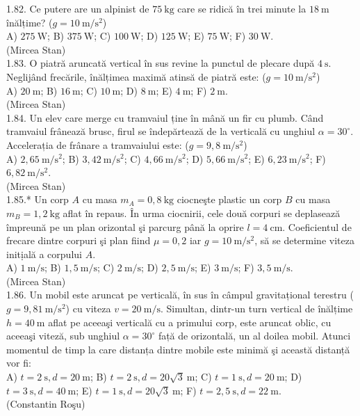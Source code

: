 \documentclass[10pt]{article}
\begin{document}
1.82. Ce putere are un alpinist de $75 \mathrm{~kg}$ care se ridică în trei minute la $18 \mathrm{~m}$ înălțime? ($g=10 \mathrm{~m} / \mathrm{s}^{2}$)\\ A) $275 \mathrm{~W}$; B) $375 \mathrm{~W}$; C) $100 \mathrm{~W}$; D) $125 \mathrm{~W}$; E) $75 \mathrm{~W}$; F) $30 \mathrm{~W}$.\\ (Mircea Stan)\\

1.83. O piatră aruncată vertical în sus revine la punctul de plecare după $4 \mathrm{~s}$. Neglijând frecările, înălțimea maximă atinsă de piatră este: ($g=10 \mathrm{~m} / \mathrm{s}^{2}$)\\ A) $20 \mathrm{~m}$; B) $16 \mathrm{~m}$; C) $10 \mathrm{~m}$; D) $8 \mathrm{~m}$; E) $4 \mathrm{~m}$; F) $2 \mathrm{~m}$.\\ (Mircea Stan)\\

1.84. Un elev care merge cu tramvaiul ține în mână un fir cu plumb. Când tramvaiul frânează brusc, firul se îndepărtează de la verticală cu unghiul $\alpha=30^{\circ}$. Accelerația de frânare a tramvaiului este: ($g=9,8 \mathrm{~m} / \mathrm{s}^{2}$)\\ A) $2,65 \mathrm{~m} / \mathrm{s}^{2}$; B) $3,42 \mathrm{~m} / \mathrm{s}^{2}$; C) $4,66 \mathrm{~m} / \mathrm{s}^{2}$; D) $5,66 \mathrm{~m} / \mathrm{s}^{2}$; E) $6,23 \mathrm{~m} / \mathrm{s}^{2}$; F) $6,82 \mathrm{~m} / \mathrm{s}^{2}$.\\ (Mircea Stan)\\

1.85.* Un corp $A$ cu masa $m_{A}=0,8 \mathrm{~kg}$ ciocneşte plastic un corp $B$ cu masa $m_{B}=1,2 \mathrm{~kg}$ aflat în repaus. În urma ciocnirii, cele două corpuri se deplasează împreună pe un plan orizontal şi parcurg până la oprire $l=4 \mathrm{~cm}$. Coeficientul de frecare dintre corpuri şi plan fiind $\mu=0,2$ iar $g=10 \mathrm{~m} / \mathrm{s}^{2}$, să se determine viteza initịală a corpului $A$.\\ A) $1 \mathrm{~m} / \mathrm{s}$; B) $1,5 \mathrm{~m} / \mathrm{s}$; C) $2 \mathrm{~m} / \mathrm{s}$; D) $2,5 \mathrm{~m} / \mathrm{s}$; E) $3 \mathrm{~m} / \mathrm{s}$; F) $3,5 \mathrm{~m} / \mathrm{s}$.\\ (Mircea Stan)\\

1.86. Un mobil este aruncat pe verticală, în sus în câmpul gravitațional terestru ($g=9,81 \mathrm{~m} / \mathrm{s}^{2}$) cu viteza $v=20 \mathrm{~m} / \mathrm{s}$. Simultan, dintr-un turn vertical de înălțime $h=40 \mathrm{~m}$ aflat pe aceeaşi verticală cu a primului corp, este aruncat oblic, cu aceeaşi viteză, sub unghiul $\alpha=30^{\circ}$ față de orizontală, un al doilea mobil. Atunci momentul de timp la care distanța dintre mobile este minimă şi această distanță vor fi:\\ A) $t=2 \mathrm{~s}, d=20 \mathrm{~m}$; B) $t=2 \mathrm{~s}, d=20 \sqrt{3} \mathrm{~m}$; C) $t=1 \mathrm{~s}, d=20 \mathrm{~m}$; D) $t=3 \mathrm{~s}, d=40 \mathrm{~m}$; E) $t=1 \mathrm{~s}, d=20 \sqrt{3} \mathrm{~m}$; F) $t=2,5 \mathrm{~s}, d=22 \mathrm{~m}$.\\ (Constantin Roşu)\\
\end{document}
